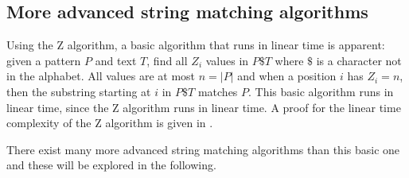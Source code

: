 \subsection{More advanced string matching algorithms}

Using the Z algorithm, a basic algorithm that runs in linear time is apparent: given a pattern $P$ and text $T$, find all $Z_i$ values in $P\$T$ where $\$$ is a character not in the alphabet. All values are at most $n=|P|$ and when a position $i$ has $Z_i=n$, then the substring starting at $i$ in $P\$T$ matches $P$. This basic algorithm runs in linear time, since the Z algorithm runs in linear time. A proof for the linear time complexity of the Z algorithm is given in \cite{Gusfield1997AlgorithmsOS}. 

There exist many more advanced string matching algorithms than this basic one and these will be explored in the following. 
